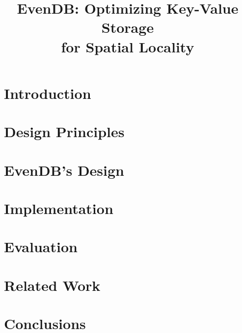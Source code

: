 \documentclass[sigplan,10pt]{acmart}
\date{}
\newcommand{\sys}{EvenDB}
\begin{document}
\title{\sys: Optimizing Key-Value Storage\\ for Spatial Locality} 
\author{}

\begin{abstract}

\end{abstract}

\maketitle

\section{Introduction}


\section{Design Principles}
\label{sec:principles}

\section{\sys's Design}
\label{sec:design}


\section{Implementation}
\label{sec:impl}


\section{Evaluation}
\label{sec:eval}


\section{Related Work}
\label{sec:related}


\section{Conclusions}
\label{sec:conclusions}




\clearpage


\end{document}
